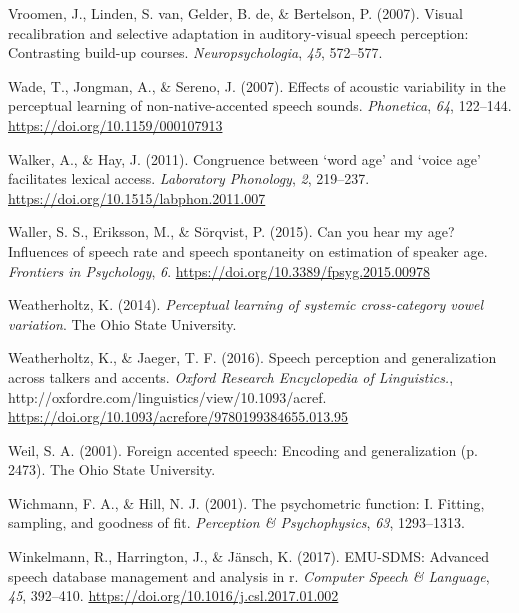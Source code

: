 \documentclass[
  11pt,
  english,
  man,floatsintext]{apa6}
\newlength{\cslhangindent}
\newlength{\cslentryspacingunit} %
\newenvironment{CSLReferences}[2] %
 {%
  \setlength{\parindent}{0pt}
  \ifodd #1
  \let\oldpar\par
  \def\par{\hangindent=\cslhangindent\oldpar}
  \fi
  \setlength{\parskip}{#2\cslentryspacingunit}
 }%
 {}
\begin{document}
\begin{CSLReferences}{1}{0}
\leavevmode{}%
Vroomen, J., Linden, S. van, Gelder, B. de, \& Bertelson, P. (2007). Visual recalibration and selective adaptation in auditory-visual speech perception: Contrasting build-up courses. \emph{Neuropsychologia}, \emph{45}, 572--577.

\leavevmode{}%
Wade, T., Jongman, A., \& Sereno, J. (2007). Effects of acoustic variability in the perceptual learning of non-native-accented speech sounds. \emph{Phonetica}, \emph{64}, 122--144. \url{https://doi.org/10.1159/000107913}

\leavevmode{}%
Walker, A., \& Hay, J. (2011). Congruence between {`word age'} and {`voice age'} facilitates lexical access. \emph{Laboratory Phonology}, \emph{2}, 219--237. \url{https://doi.org/10.1515/labphon.2011.007}

\leavevmode{}%
Waller, S. S., Eriksson, M., \& Sörqvist, P. (2015). Can you hear my age? Influences of speech rate and speech spontaneity on estimation of speaker age. \emph{Frontiers in Psychology}, \emph{6}. \url{https://doi.org/10.3389/fpsyg.2015.00978}

\leavevmode{}%
Weatherholtz, K. (2014). \emph{Perceptual learning of systemic cross-category vowel variation}. The Ohio State University.

\leavevmode{}%
Weatherholtz, K., \& Jaeger, T. F. (2016). Speech perception and generalization across talkers and accents. \emph{Oxford Research Encyclopedia of Linguistics.}, http://oxfordre.com/linguistics/view/10.1093/acref. \url{https://doi.org/10.1093/acrefore/9780199384655.013.95}

\leavevmode{}%
Weil, S. A. (2001). Foreign accented speech: Encoding and generalization (p. 2473). The Ohio State University.

\leavevmode{}%
Wichmann, F. A., \& Hill, N. J. (2001). The psychometric function: I. Fitting, sampling, and goodness of fit. \emph{Perception \& Psychophysics}, \emph{63}, 1293--1313.

\leavevmode{}%
Winkelmann, R., Harrington, J., \& Jänsch, K. (2017). EMU-SDMS: Advanced speech database management and analysis in r. \emph{Computer Speech \& Language}, \emph{45}, 392--410. \url{https://doi.org/10.1016/j.csl.2017.01.002}


\end{CSLReferences}
\end{document}
